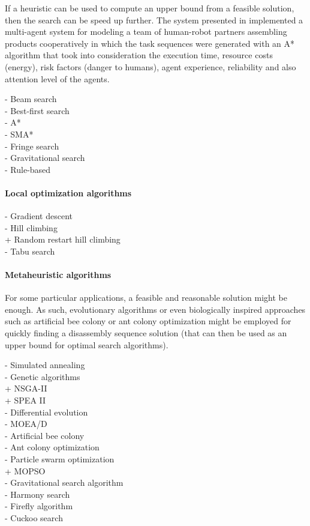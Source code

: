 If a heuristic can be used to compute an upper bound from a feasible solution, then the search can be speed up further. The system presented in \cite{Johannsmeier2017} implemented a multi-agent system for modeling a team of human-robot partners assembling products cooperatively in which the task sequences were generated with an A* algorithm that took into consideration the execution time, resource costs (energy), risk factors (danger to humans), agent experience, reliability and also attention level of the agents.

- Beam search\\
- Best-first search\\
- A*\\
- SMA*\\
- Fringe search\\
- Gravitational search\\
- Rule-based \cite{Smith2011}\\



\paragraph{Local optimization algorithms}

- Gradient descent\\
- Hill climbing\\
	+ Random restart hill climbing\\
- Tabu search\\



\paragraph{Metaheuristic algorithms}

For some particular applications, a feasible and reasonable solution might be enough. As such, evolutionary algorithms \cite{Elsayed2012} or even biologically inspired approaches such as artificial bee colony \cite{Yuan2016} or ant colony optimization \cite{Liu2012} might be employed for quickly finding a disassembly sequence solution (that can then be used as an upper bound for optimal search algorithms).

- Simulated annealing\\
- Genetic algorithms\\
	+ NSGA-II\\
	+ SPEA II\\
- Differential evolution\\
- MOEA/D\\
- Artificial bee colony\\
- Ant colony optimization\\
- Particle swarm optimization\\
	+ MOPSO\\
- Gravitational search algorithm\\
- Harmony search\\
- Firefly algorithm\\
- Cuckoo search\\



